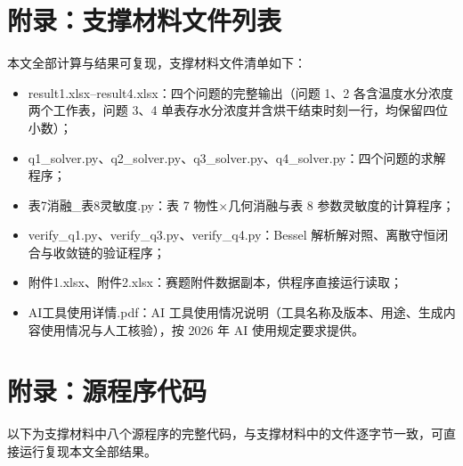 \documentclass[12pt,a4paper]{ctexart}
\begin{document}
\section*{附录：支撑材料文件列表}

\noindent 本文全部计算与结果可复现，支撑材料文件清单如下：
\begin{itemize}[leftmargin=2em]
\item result1.xlsx--result4.xlsx：四个问题的完整输出（问题 1、2 各含温度水分浓度两个工作表，问题 3、4 单表存水分浓度并含烘干结束时刻一行，均保留四位小数）；
\item q1\_solver.py、q2\_solver.py、q3\_solver.py、q4\_solver.py：四个问题的求解程序；
\item 表7消融\_表8灵敏度.py：表 7 物性×几何消融与表 8 参数灵敏度的计算程序；
\item verify\_q1.py、verify\_q3.py、verify\_q4.py：Bessel 解析解对照、离散守恒闭合与收敛链的验证程序；
\item 附件1.xlsx、附件2.xlsx：赛题附件数据副本，供程序直接运行读取；
\item AI工具使用详情.pdf：AI 工具使用情况说明（工具名称及版本、用途、生成内容使用情况与人工核验），按 2026 年 AI 使用规定要求提供。
\end{itemize}

\section*{附录：源程序代码}

\noindent 以下为支撑材料中八个源程序的完整代码，与支撑材料中的文件逐字节一致，可直接运行复现本文全部结果。


\end{document}

